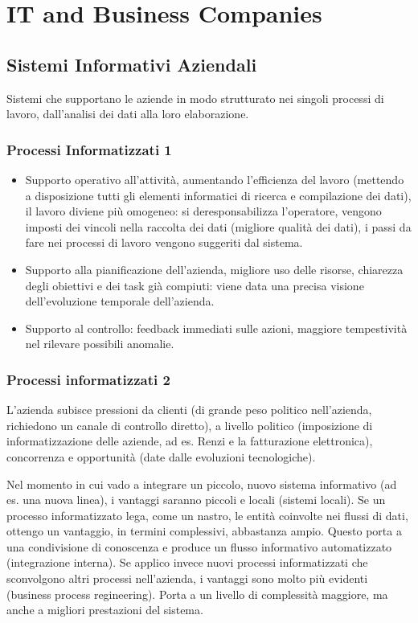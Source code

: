 \chapter{IT and Business Companies}
\label{chap:IT and Business Companies}
\section{Sistemi Informativi Aziendali}
\label{sec:Business Information System}
Sistemi che supportano le aziende in modo strutturato nei singoli processi di lavoro,
dall'analisi dei dati alla loro elaborazione.
\subsection{Processi Informatizzati 1}
\begin{itemize}
  \item Supporto operativo all'attivit\`a, aumentando l'efficienza del lavoro (mettendo a disposizione
  tutti gli elementi informatici di ricerca e compilazione dei dati), il lavoro diviene pi\`u omogeneo: si
  deresponsabilizza l'operatore, vengono imposti dei vincoli nella raccolta dei dati (migliore
  qualit\`a dei dati), i passi da fare nei processi di lavoro vengono suggeriti dal sistema.
  \item Supporto alla pianificazione dell'azienda, migliore uso delle risorse, chiarezza
  degli obiettivi e dei task gi\`a compiuti: viene data una precisa visione dell'evoluzione
  temporale dell'azienda.
  \item Supporto al controllo: feedback immediati sulle azioni, maggiore tempestivit\`a nel
  rilevare possibili anomalie.
\end{itemize}

\subsection{Processi informatizzati 2}
\label{sub:Processi informatizzati}
L'azienda subisce pressioni da clienti (di grande peso politico nell'azienda, richiedono un canale di controllo diretto),
a livello politico (imposizione
di informatizzazione delle aziende, ad es. Renzi e la fatturazione elettronica),
 concorrenza e opportunit\`a (date dalle evoluzioni tecnologiche).

Nel momento in cui vado a integrare un piccolo, nuovo sistema informativo (ad es. una nuova linea),
i vantaggi saranno piccoli e locali (sistemi locali).
Se un processo informatizzato lega, come un nastro, le entit\`a coinvolte nei flussi di dati, ottengo un vantaggio, in termini complessivi,
abbastanza ampio. Questo porta a una condivisione di conoscenza e produce un flusso informativo
automatizzato (integrazione interna).
Se applico invece nuovi processi informatizzati che sconvolgono altri processi nell'azienda, i vantaggi sono
molto pi\`u evidenti (business process regineering). Porta a un livello di
complessit\`a maggiore, ma anche a migliori prestazioni del sistema.

